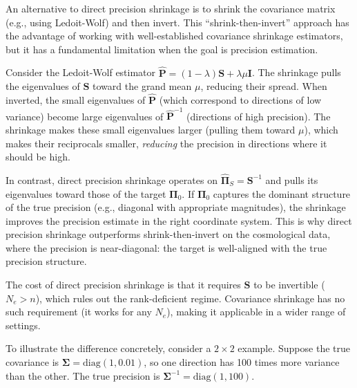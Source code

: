 An alternative to direct precision shrinkage is to shrink the covariance matrix (e.g., using Ledoit-Wolf) and then invert. This ``shrink-then-invert'' approach has the advantage of working with well-established covariance shrinkage estimators, but it has a fundamental limitation when the goal is precision estimation.

Consider the Ledoit-Wolf estimator $\hat{\mathbf{P}} = (1 - \lambda) \mathbf{S} + \lambda \mu \mathbf{I}$. The shrinkage pulls the eigenvalues of $\mathbf{S}$ toward the grand mean $\mu$, reducing their spread. When inverted, the small eigenvalues of $\hat{\mathbf{P}}$ (which correspond to directions of low variance) become large eigenvalues of $\hat{\mathbf{P}}^{-1}$ (directions of high precision). The shrinkage makes these small eigenvalues larger (pulling them toward $\mu$), which makes their reciprocals smaller, \emph{reducing} the precision in directions where it should be high.

In contrast, direct precision shrinkage operates on $\hat{\boldsymbol{\Pi}}_S = \mathbf{S}^{-1}$ and pulls its eigenvalues toward those of the target $\boldsymbol{\Pi}_0$. If $\boldsymbol{\Pi}_0$ captures the dominant structure of the true precision (e.g., diagonal with appropriate magnitudes), the shrinkage improves the precision estimate in the right coordinate system. This is why direct precision shrinkage outperforms shrink-then-invert on the cosmological data, where the precision is near-diagonal: the target is well-aligned with the true precision structure.

The cost of direct precision shrinkage is that it requires $\mathbf{S}$ to be invertible ($N_e > n$), which rules out the rank-deficient regime. Covariance shrinkage has no such requirement (it works for any $N_e$), making it applicable in a wider range of settings.

To illustrate the difference concretely, consider a $2 \times 2$ example. Suppose the true covariance is $\boldsymbol{\Sigma} = \text{diag}(1, 0.01)$, so one direction has 100 times more variance than the other. The true precision is $\boldsymbol{\Sigma}^{-1} = \text{diag}(1, 100)$.

